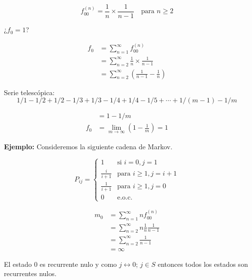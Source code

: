 \documentclass[12pt,a4paper]{article}
\begin{document}
\begin{equation}
f_{00}^{(n)} = \frac{1}{n} \times \frac{1}{n-1} \quad \text{para } n \geq 2
\end{equation}

¿$f_0 = 1$?

\begin{align*}
f_0 &= \sum_{n=1}^{\infty} f_{00}^{(n)} \\
&= \sum_{n=2}^{\infty} \frac{1}{n} \times \frac{1}{n-1} \\
&= \sum_{n=2}^{\infty} \left(\frac{1}{n-1} - \frac{1}{n}\right)
\end{align*}

Serie telescópica:
\begin{equation}
1/1 - 1/2 + 1/2 - 1/3 + 1/3 - 1/4 + 1/4 - 1/5 + \cdots + 1/(m-1) - 1/m
\end{equation}

\begin{align*}
&= 1 - 1/m \\
f_0 &= \lim_{m \to \infty} \left(1 - \frac{1}{m}\right) = 1
\end{align*}

\textbf{Ejemplo:} Consideremos la siguiente cadena de Markov.

\begin{equation*}
P_{ij} = \begin{cases}
1 & \text{si } i=0, j=1 \\
\frac{i}{i+1} & \text{para } i \geq 1, j=i+1 \\
\frac{1}{i+1} & \text{para } i \geq 1, j=0 \\
0 & \text{e.o.c.}
\end{cases}
\end{equation*}

\begin{align*}
m_0 &= \sum_{n=1}^{\infty} n f_{00}^{(n)} \\
&= \sum_{n=2}^{\infty} n \frac{1}{n} \frac{1}{n-1} \\
&= \sum_{n=2}^{\infty} \frac{1}{n-1} \\
&= \infty
\end{align*}

El estado 0 es recurrente nulo y como $j \leftrightarrow 0$; $j \in S$ entonces todos los estados son recurrentes nulos.
\end{document}
